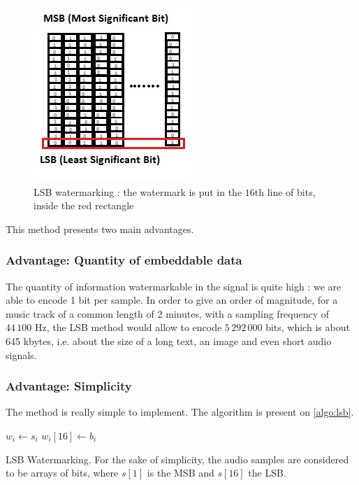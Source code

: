 \begin{figure}[h!]
\centering
\includegraphics{images/LSB2.jpg}
\caption{LSB watermarking : the watermark is put in the $16$th line of bits, inside the red rectangle}
\label{fig:lsb}
\end{figure}

This method presents two main advantages. 
\subsubsection{Advantage: Quantity of embeddable data}
The quantity of information watermarkable in the signal is quite high : we are able to encode 1 bit per sample. In order to give an order of magnitude, for a music track of a common length of 2 minutes, with a sampling frequency of $44\,100$ Hz, the \ac{LSB} method would allow to encode $5\,292\,000$ bits, which is about 645 kbytes, i.e. about the size of a long text, an image and even short audio signals. 
\subsubsection{Advantage: Simplicity}
The method is really simple to implement.
The algorithm is present on \ref{algo:lsb}.

\begin{algorithm}
\DontPrintSemicolon
{}

 {

  $w_i \gets s_i$ \;  
  $w_i [16] \gets b_i$ \;

}

\;

\caption{\ac{LSB} Watermarking. For the sake of simplicity, the audio samples are considered to be arrays of bits, where $s[1]$ is the \ac{MSB} and $s[16]$ the \ac{LSB}.}

\label{algo:lsb}

\end{algorithm}

